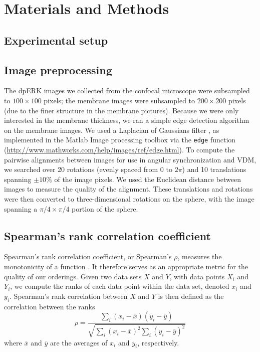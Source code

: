 \documentclass[10pt]{article}
\begin{document}
\section*{Materials and Methods}

\subsection*{Experimental setup}

\subsection*{Image preprocessing}
The dpERK images we collected from the confocal microscope were subsampled to $100 \times 100$ pixels; 
the membrane images were subsampled to $200 \times 200$ pixels (due to the finer structure in the membrane pictures). 
%
Because we were only interested in the membrane thickness, we ran a simple edge detection algorithm on the membrane images.
%
We used a Laplacian of Gaussians filter \cite{canny1986computational}, as implemented in the Matlab Image processing toolbox via the \texttt{edge} function (\url{http://www.mathworks.com/help/images/ref/edge.html}).
%
To compute the pairwise alignments between images for use in angular synchronization and VDM, we searched over 20 rotations (evenly spaced from $0$ to $2 \pi$) and 10 translations spanning $\pm 10 \%$ of the image pixels.
%
We used the Euclidean distance between images to measure the quality of the alignment.
%
These translations and rotations were then converted to three-dimensional rotations on the sphere, with the image spanning a $\pi/4 \times \pi/4$ portion of the sphere.%

\subsection*{Spearman's rank correlation coefficient}

Spearman's rank correlation coefficient, or Spearman's $\rho$, measures the monotonicity of a function \cite{myers2010research}. 
%
It therefore serves as an appropriate metric for the quality of our orderings.
%
Given two data sets $X$ and $Y$, with data points $X_i$ and $Y_i$, we compute the ranks of each data point within the data set, denoted $x_i$ and $y_i$.
%
Spearman's rank correlation between $X$ and $Y$ is then defined as the correlation between the ranks
\begin{equation}
\rho = \frac{\sum_i (x_i - \overline{x})(y_i - \overline{y})}{\sqrt{\sum_i (x_i - \overline{x})^2 \sum_i (y_i - \overline{y})^2}}
\end{equation}
where $\overline{x}$ and $\overline{y}$ are the averages of $x_i$ and $y_i$, respectively. 
\end{document}
